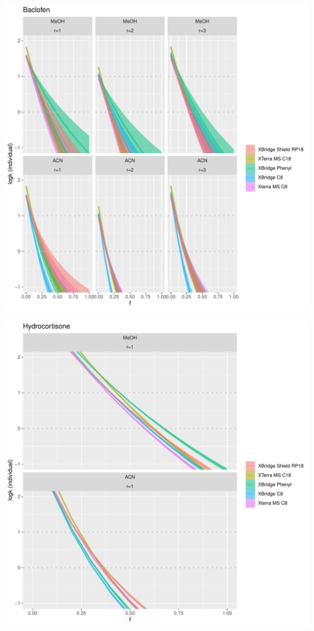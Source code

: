 \documentclass[
]{article}
\begin{document}
\includegraphics{../figures/izoparam/isopred/Baclofen.individual.pdf}

\newpage{}

\includegraphics{../figures/izoparam/isopred/Hydrocortisone.individual.pdf}
\end{document}
